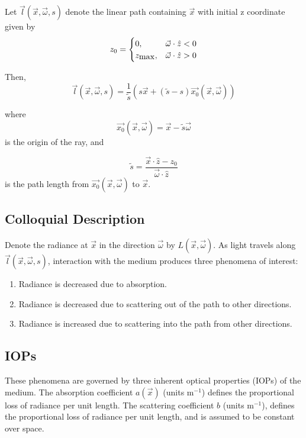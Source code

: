 Let $\vec{l}(\vec{x}, \vec{\omega}, s)$ denote the linear path containing $\vec{x}$
with initial z coordinate given by
\begin{equation}
  z_0 =
   \begin{cases}
    0, & \vec{\omega} \cdot \hat{z} < 0 \\
    z_{\mbox{max}}, & \vec{\omega} \cdot \hat{z} > 0
  \end{cases}
\end{equation}

Then,
\begin{equation}
  \vec{l}(\vec{x}, \vec{\omega}, s) = \frac{1}{\tilde{s}} (s\vec{x} + (\tilde{s} - s)\vec{x_0}(\vec{x}, \vec{\omega}))
\end{equation}

where
\begin{equation}
  \vec{x_0}(\vec{x}, \vec{\omega}) = \vec{x} - \tilde{s} \vec{\omega}
\end{equation}
is the origin of the ray, and 

\begin{equation}
  \tilde{s} = \frac{\vec{x} \cdot \hat{z} - z_0}{\vec{\omega} \cdot \hat{z}}
\end{equation}
is the path length from $\vec{x_0}(\vec{x}, \vec{\omega})$ to $\vec{x}$.

\subsection{Colloquial Description}
Denote the radiance at $\vec{x}$ in the direction $\vec{\omega}$ by $L(\vec{x}, \vec{\omega})$.
As light travels along $\vec{l}(\vec{x}, \vec{\omega}, s)$, interaction with the
medium produces three phenomena of interest:
\begin{enumerate}
  \item Radiance is decreased due to absorption.
  \item Radiance is decreased due to scattering out of the path to other
    directions.
  \item Radiance is increased due to scattering into the path from other
      directions.
\end{enumerate}

\subsection{IOPs}
These phenomena are governed by three inherent optical properties (IOPs) of the
medium.
The absorption coefficient $a(\vec{x})$ (units m$^{-1}$) defines the
proportional loss of radiance per unit length.
The scattering coefficient $b$ (units m$^{-1}$), defines the proportional loss
of radiance per unit length, and is assumed to be constant over space.

